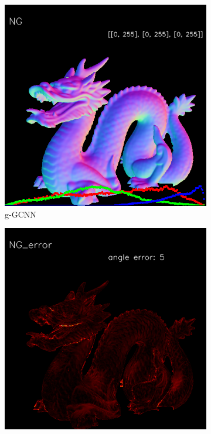 \documentclass[]{article}
\begin{document}
\begin{figure}[h!]
\begin{subfigure}[b]{0.19\linewidth}
		\includegraphics[width=\linewidth]{./Figures/ng-synthetic/fancy_eval_3_normal_NG.png}
		\caption{g-GCNN}
	\end{subfigure}
	\begin{subfigure}[b]{0.19\linewidth}
		\includegraphics[width=\linewidth]{./Figures/ng-synthetic/fancy_eval_3_error_NG.png}

\end{subfigure}
\end{figure}
\end{document}
